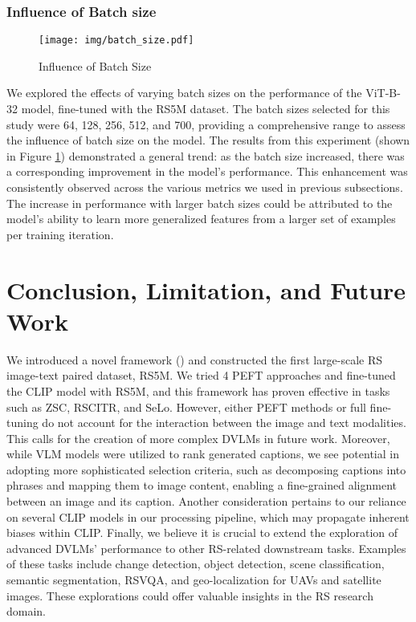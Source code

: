 \documentclass[journal]{IEEEtran}
\begin{document}
\subsubsection{Influence of Batch size}



\begin{figure}
    \centering
    \texttt{[image: img/batch\_size.pdf]}
    \caption{Influence of Batch Size}
    \label{fig:batch_size}
\end{figure}

We explored the effects of varying batch sizes on the performance of the ViT-B-32 model, fine-tuned with the RS5M dataset. The batch sizes selected for this study were 64, 128, 256, 512, and 700, providing a comprehensive range to assess the influence of batch size on the model.
The results from this experiment (shown in Figure \ref{fig:batch_size}) demonstrated a general trend: as the batch size increased, there was a corresponding improvement in the model's performance. This enhancement was consistently observed across the various metrics we used in previous subsections. The increase in performance with larger batch sizes could be attributed to the model's ability to learn more generalized features from a larger set of examples per training iteration. 










\section{Conclusion, Limitation, and Future Work}
We introduced a novel framework () and constructed the first large-scale RS image-text paired dataset, RS5M. We tried 4 PEFT approaches and fine-tuned the CLIP model with RS5M, and this framework has proven effective in tasks such as ZSC, RSCITR, and SeLo. However, either PEFT methods or full fine-tuning do not account for the interaction between the image and text modalities. This calls for the creation of more complex DVLMs in future work. Moreover, while VLM models were utilized to rank generated captions, we see potential in adopting more sophisticated selection criteria, such as decomposing captions into phrases and mapping them to image content, enabling a fine-grained alignment between an image and its caption. Another consideration pertains to our reliance on several CLIP models in our processing pipeline, which may propagate inherent biases within CLIP. Finally, we believe it is crucial to extend the exploration of advanced DVLMs' performance to other RS-related downstream tasks. Examples of these tasks include change detection, object detection, scene classification, semantic segmentation, RSVQA, and geo-localization for UAVs and satellite images. These explorations could offer valuable insights in the RS research domain.
\end{document}
